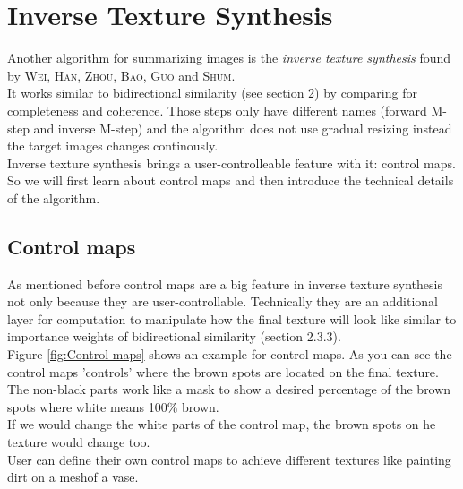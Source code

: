 \section{Inverse Texture Synthesis}
Another algorithm for summarizing images is the \textit{inverse texture synthesis} found by \textsc{Wei, Han, Zhou, Bao, Guo} and \textsc{Shum}.\\
It works similar to bidirectional similarity (see section 2) by comparing for completeness and coherence. Those steps only have different names (forward M-step and inverse M-step) and the algorithm does not use gradual resizing instead the target images changes continously. \\
Inverse texture synthesis brings a user-controlleable feature with it: control maps. So we will first learn about control maps and then introduce the technical details of the algorithm.

\subsection{Control maps}
As mentioned before control maps are a big feature in inverse texture synthesis not only because they are user-controllable. Technically they are an additional layer for computation to manipulate how the final texture will look like similar to importance weights of bidirectional similarity (section 2.3.3).\\
Figure \ref{fig:Control maps} shows an example for control maps. As you can see the control maps 'controls' where the brown spots are located on the final texture. The non-black parts work like a mask to show a desired percentage of the brown spots where white means 100\% brown.\\
If we would change the white parts of the control map, the brown spots on he texture would change too.\\
User can define their own control maps to achieve different textures like painting dirt on a mesh\footnotemark  of a vase. 


